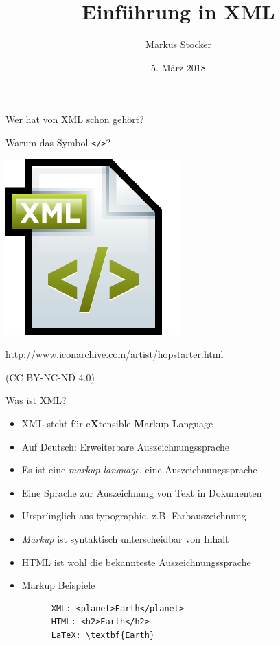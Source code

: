 \documentclass{beamer}
\title{Einführung in XML}
\author{Markus Stocker}
\date{5. März 2018}
\begin{document}
\maketitle

\begin{frame}
	
	\centering\huge
	Wer hat von XML schon gehört?
	
	\vspace{0.5cm}
	\Large
	Warum das Symbol \texttt{</>}?
	
	\vspace{1cm}
	
	\includegraphics[scale=0.3]{xml.png}
	
	\vspace{0.5cm}
	\tiny
	http://www.iconarchive.com/artist/hopstarter.html 
	
	(CC BY-NC-ND 4.0)
	
\end{frame}

\begin{frame}[fragile]{Was ist XML?}
  
  \begin{itemize}
  	\item XML steht für e\textbf{X}tensible \textbf{M}arkup \textbf{L}anguage
  	\item Auf Deutsch: Erweiterbare Auszeichnungssprache
  	\item Es ist eine \emph{markup language}, eine Auszeichnungssprache
  	\item Eine Sprache zur Auszeichnung von Text in Dokumenten
  	\item Ursprünglich aus typographie, z.B. Farbauszeichnung
  	\item \emph{Markup} ist syntaktisch unterscheidbar von Inhalt
  	\item HTML ist wohl die bekannteste Auszeichnungssprache
  	\item Markup Beispiele
	\begin{lstlisting}
   	  XML: <planet>Earth</planet>
	  HTML: <h2>Earth</h2> 
	  LaTeX: \textbf{Earth}
  	\end{lstlisting}
  \end{itemize}
  
\end{frame}
\end{document}
